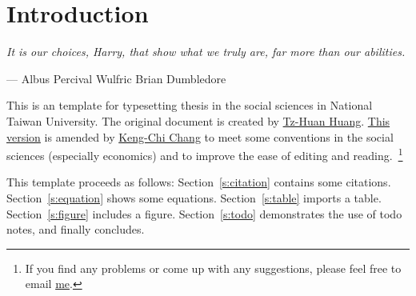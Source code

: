 \chapter{Introduction}
\label{c:intro}

\epigraph{
\fontsize{12}{13}\selectfont 
\it
It is our choices, Harry, that show what we truly are, 
far more than our abilities.
}
{
\fontsize{12}{16}\selectfont 
--- Albus Percival Wulfric Brian Dumbledore
}



This is an \XeLaTeX template for typesetting thesis in the social sciences in 
National Taiwan University. 
The original document is created by 
\href{https://github.com/tzhuan/ntu-thesis}{Tz-Huan Huang}. 
\href{https://github.com/KengChiChang/ntuthesis-socsci}{This version} 
is amended by 
\href{https://github.com/KengChiChang/ntuthesis-socsci}{Keng-Chi Chang}
to meet some conventions in the social sciences (especially economics)
and to improve the ease of editing and reading.~\footnote{
  If you find any problems or come up with any suggestions, 
  please feel free to email 
  \href{mailto:kengchi.chang.tw@gmail.com?subject=ntuthesis-socsci}{me}.
}

This template proceeds as follows: 
Section~\ref{s:citation} contains some citations.
Section~\ref{s:equation} shows some equations.
Section~\ref{s:table} imports a table.
Section~\ref{s:figure} includes a figure.
Section~\ref{s:todo} demonstrates the use of todo notes, and finally concludes.